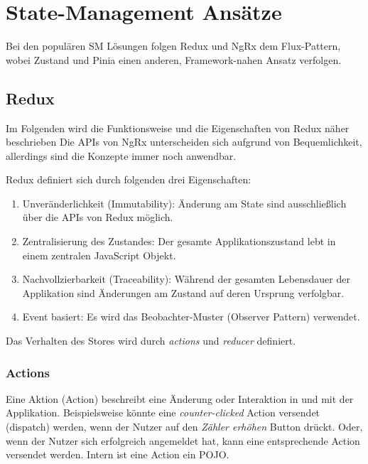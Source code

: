 \chapter{State-Management Ansätze}

Bei den populären SM Lösungen folgen Redux und NgRx dem Flux-Pattern\cite{historyOfRedux}\cite{ngrxGettingStarted}, wobei Zustand und Pinia einen anderen, Framework-nahen Ansatz verfolgen.

\section{Redux}

Im Folgenden wird die Funktionsweise und die Eigenschaften von Redux näher beschrieben Die APIs von NgRx unterscheiden sich aufgrund von Bequemlichkeit, allerdings sind die Konzepte immer noch anwendbar.

Redux definiert sich durch folgenden drei Eigenschaften:
\begin{enumerate}
  \item Unveränderlichkeit (Immutability): Änderung am State sind ausschließlich über die APIs von Redux möglich.
  \item Zentralisierung des Zustandes: Der gesamte Applikationszustand lebt in einem zentralen JavaScript Objekt.
  \item Nachvollzierbarkeit (Traceability): Während der gesamten Lebensdauer der Applikation sind Änderungen am Zustand auf deren Ursprung verfolgbar.
  \item Event basiert: Es wird das Beobachter-Muster (Observer Pattern) verwendet.
\end{enumerate}

Das Verhalten des Stores wird durch \textit{actions} und \textit{reducer} definiert.

\subsection{Actions}

Eine Aktion (Action) beschreibt eine Änderung oder Interaktion in und mit der Applikation. Beispielsweise könnte eine \textit{counter-clicked} Action versendet (dispatch) werden, wenn der Nutzer auf den \textit{Zähler erhöhen} Button drückt. Oder, wenn der Nutzer sich erfolgreich angemeldet hat, kann eine entsprechende Action versendet werden. Intern ist eine Action ein POJO.\cite{reduxStateActionReducers}

